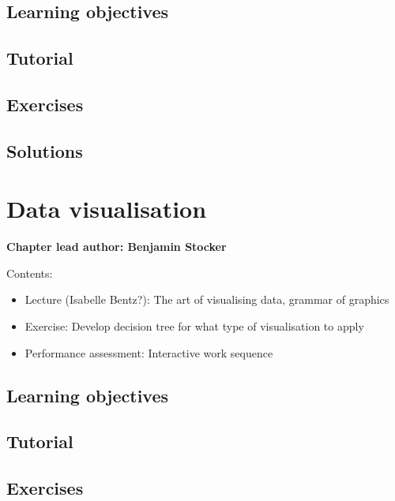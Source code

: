 \documentclass[
]{book}
\providecommand{\tightlist}{%
  \setlength{\itemsep}{0pt}\setlength{\parskip}{0pt}}
\begin{document}
\hypertarget{learning-objectives-2}{%
\section{Learning objectives}\label{learning-objectives-2}}

\hypertarget{tutorial-2}{%
\section{Tutorial}\label{tutorial-2}}

\hypertarget{exercises-2}{%
\section{Exercises}\label{exercises-2}}

\hypertarget{solutions-2}{%
\section{Solutions}\label{solutions-2}}

\hypertarget{data_vis}{%
\chapter{Data visualisation}\label{data_vis}}

\textbf{Chapter lead author: Benjamin Stocker}

Contents:

\begin{itemize}
\tightlist
\item
  Lecture (Isabelle Bentz?): The art of visualising data, grammar of graphics
\item
  Exercise: Develop decision tree for what type of visualisation to apply
\item
  Performance assessment: Interactive work sequence
\end{itemize}

\hypertarget{learning-objectives-3}{%
\section{Learning objectives}\label{learning-objectives-3}}

\hypertarget{tutorial-3}{%
\section{Tutorial}\label{tutorial-3}}

\hypertarget{exercises-3}{%
\section{Exercises}\label{exercises-3}}
\end{document}
